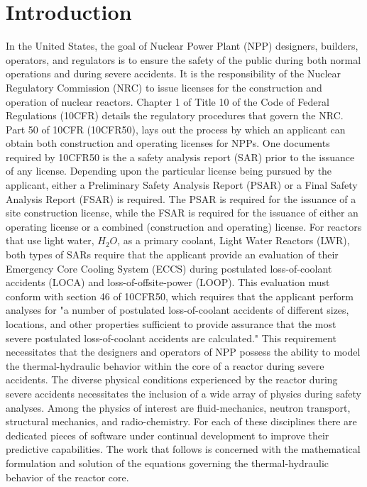 \chapter{Introduction}
\label{chap:intro}
In the United States, the goal of Nuclear Power Plant (NPP) designers, builders, operators, and regulators is to ensure the safety of the public during both normal operations and during severe accidents.
It is the responsibility of the Nuclear Regulatory Commission (NRC) to issue licenses for the construction and operation of nuclear reactors.
Chapter 1 of Title 10 of the Code of Federal Regulations (10CFR) details the regulatory procedures that govern the NRC.
Part 50 of 10CFR (10CFR50), lays out the process by which an applicant can obtain both construction and operating licenses for NPPs.
One documents required by 10CFR50 is the a safety analysis report (SAR) prior to the issuance of any license.
Depending upon the particular license being pursued by the applicant, either a Preliminary Safety Analysis Report (PSAR) or a Final Safety Analysis Report (FSAR) is required.
The PSAR is required for the issuance of a site construction license, while the FSAR is required for the issuance of either an operating license or a combined (construction and operating) license.
For reactors that use light water, $H_2 O$, as a primary coolant, Light Water Reactors (LWR), both types of SARs require that the applicant provide an evaluation of their Emergency Core Cooling System (ECCS) during postulated loss-of-coolant accidents (LOCA) and loss-of-offsite-power (LOOP).
This evaluation must conform with section 46 of 10CFR50, which requires that the applicant perform analyses for "a number of postulated loss-of-coolant accidents of different sizes, locations, and other properties sufficient to provide assurance that the most severe postulated loss-of-coolant accidents are calculated."
This requirement necessitates that the designers and operators of NPP possess the ability to model the thermal-hydraulic behavior within the core of a reactor during severe accidents.  
The diverse physical conditions experienced by the reactor during severe accidents necessitates the inclusion of a wide array of physics during safety analyses.
Among the physics of interest are fluid-mechanics, neutron transport, structural mechanics, and radio-chemistry.
For each of these disciplines there are dedicated pieces of software under continual development to improve their predictive capabilities.
The work that follows is concerned with the mathematical formulation and solution of the equations governing the thermal-hydraulic behavior of the reactor core.

